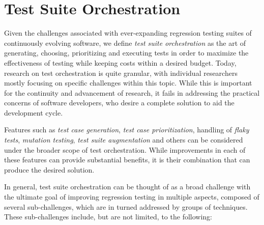 \section{Test Suite Orchestration}\label{sec:orchestration}

Given the challenges associated with ever-expanding regression testing suites of continuously evolving software, we define
\textit{test suite orchestration} as the art of generating, choosing, prioritizing and executing tests in order to maximize the effectiveness of testing while keeping costs within a desired budget.
Today, research on test orchestration is quite granular, with individual researchers mostly focusing on specific challenges within this topic.
While this is important for the continuity and advancement of research, it fails in addressing the practical concerns of software developers, who desire a complete solution to aid the development cycle.

Features such as \textit{test case generation}, \textit{test case prioritization}, handling of \textit{flaky tests}, \textit{mutation testing}, \textit{test suite augmentation} and others can be considered under the broader scope of test orchestration.
While improvements in each of these features can provide substantial benefits, it is their combination that can produce the desired solution.

In general, test suite orchestration can be thought of as a broad challenge with the ultimate goal of improving regression testing in multiple aspects, composed of several sub-challenges, which are in turned addressed by groups of techniques.
These sub-challenges include, but are not limited, to the following:

